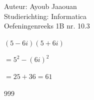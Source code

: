 \documentclass[a4paper]{article}
\begin{document}
\noindent \large Auteur: Ayoub Jaaouan \\
\noindent \large Studierichting: Informatica\\
\noindent \large Oefeningenreeks 1B nr. 10.3\\

\medskip

\normalsize

$\left(5-6i\right)\left(5+6i\right)$

$= 5^2 - \left(6i\right)^2$

$= 25 + 36 = 61$

\begin{thebibliography}{999}
\end{thebibliography}
\end{document}
